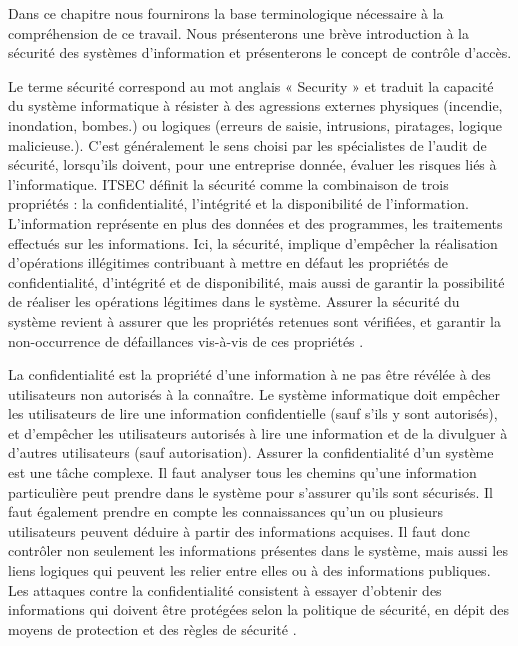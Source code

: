 \label{chapGénéralité}

\label{sectionIntroduction}

Dans ce chapitre nous fournirons la base terminologique nécessaire à la compréhension de ce travail. Nous présenterons une brève introduction à la sécurité des systèmes d'information et présenterons le concept de contrôle d'accès.

\label{sectionSécuritéSI}

\label{sectionSécurité}
Le terme sécurité correspond au mot anglais « Security » et traduit la capacité du système informatique à résister à des agressions externes physiques (incendie, inondation, bombes.) ou logiques (erreurs de saisie, intrusions, piratages, logique malicieuse.). C'est généralement le sens choisi par les spécialistes de l'audit de sécurité, lorsqu'ils doivent, pour une entreprise donnée, évaluer les risques liés à l'informatique. ITSEC définit la sécurité comme la combinaison de trois propriétés : la confidentialité, l'intégrité et la disponibilité de l'information. L'information représente en plus des données et des programmes, les traitements effectués sur les informations. Ici, la sécurité, implique d'empêcher la réalisation d'opérations illégitimes contribuant à mettre en défaut les propriétés de confidentialité, d'intégrité et de disponibilité, mais aussi de garantir la possibilité de réaliser les opérations légitimes dans le système. Assurer la sécurité du système revient à assurer que les propriétés retenues sont vérifiées, et garantir la non-occurrence de défaillances vis-à-vis de ces propriétés \cite{theseBenoit}.

\label{sectionConfidentialité}
  La confidentialité est la propriété d'une information à ne pas être révélée à des utilisateurs non autorisés à la connaître. Le système informatique doit empêcher les utilisateurs de lire une information confidentielle (sauf s'ils y sont autorisés), et d'empêcher les utilisateurs autorisés à lire une information et de la divulguer à d'autres utilisateurs (sauf autorisation). Assurer la confidentialité d'un système est une tâche complexe. Il faut analyser tous les chemins qu'une information particulière peut prendre dans le système pour s'assurer qu'ils sont sécurisés. Il faut également prendre en compte les connaissances qu'un ou plusieurs utilisateurs peuvent déduire à partir des informations acquises. Il faut donc contrôler non seulement les informations présentes dans le système, mais aussi les liens logiques qui peuvent les relier entre elles ou à des informations publiques. Les attaques contre la confidentialité consistent à essayer d'obtenir des informations qui doivent être protégées selon la politique de sécurité, en dépit des moyens de protection et des règles de sécurité \cite{theseBenoit}.

